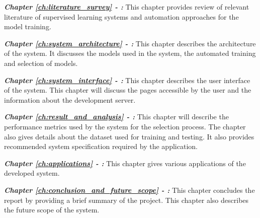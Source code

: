 \textbf{\textit{Chapter \ref{ch:literature_survey} - :}}
This chapter provides review of relevant literature of supervised learning systems and automation approaches for the model training.

\textbf{\textit{Chapter \ref{ch:system_architecture} - :}}
This chapter describes the architecture of the system. It discusses the models used in the system, the automated training and selection of models.

\textbf{\textit{Chapter \ref{ch:system_interface} - :}}
This chapter describes the user interface of the system. This chapter will discuss the pages accessible by the user and the information about the development server.

\textbf{\textit{Chapter \ref{ch:result_and_analysis} - :}}
This chapter will describe the performance metrics used by the system for the selection process. The chapter also gives details about the dataset used for training and testing. It also provides recommended system specification required by the application.

\textbf{\textit{Chapter \ref{ch:applications} - :}}
This chapter gives various applications of the developed system.

\textbf{\textit{Chapter \ref{ch:conclusion_and_future_scope} - :}}
This chapter concludes the report by providing a brief summary of the project. This chapter also describes the future scope of the system.
